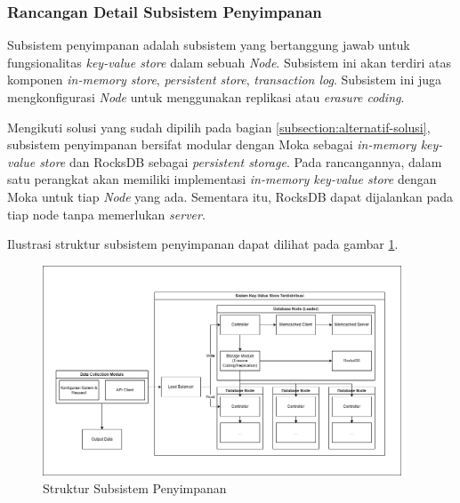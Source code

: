 \subsubsection{Rancangan Detail Subsistem Penyimpanan}
\label{subsubsection:detail-subsistem-penyimpanan}

Subsistem penyimpanan adalah subsistem yang bertanggung jawab untuk fungsionalitas \textit{key-value store} dalam sebuah \textit{Node}. Subsistem ini akan terdiri atas komponen \textit{in-memory store}, \textit{persistent store}, \textit{transaction log}. Subsistem ini juga mengkonfigurasi \textit{Node} untuk menggunakan replikasi atau \textit{erasure coding}.

Mengikuti solusi yang sudah dipilih pada bagian \ref{subsection:alternatif-solusi}, subsistem penyimpanan bersifat modular dengan Moka sebagai \textit{in-memory key-value store} dan RocksDB sebagai \textit{persistent storage}. Pada rancangannya, dalam satu perangkat akan memiliki implementasi \textit{in-memory key-value store} dengan Moka untuk tiap \textit{Node} yang ada. Sementara itu, RocksDB dapat dijalankan pada tiap node tanpa memerlukan \textit{server}.

Ilustrasi struktur subsistem penyimpanan dapat dilihat pada gambar \ref{fig:storage-subsystem-structure}.

\begin{figure}[ht]
    \centering
    \includegraphics[width=0.95\textwidth]{resources/chapter-3/general-architecture.png}
    \caption{Struktur Subsistem Penyimpanan}
    \label{fig:storage-subsystem-structure}
\end{figure}
